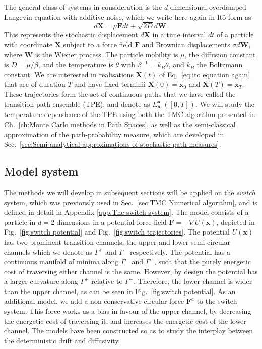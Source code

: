 The general class of systems in consideration is the $d$-dimensional overdamped Langevin equation with additive noise, which we write here again in Itô form as
\begin{equation} \label{eq:ito equation again}
d\mathbf{X}=\mu\mathbf{F}dt+\sqrt{2D}d\mathbf{W}. 
\end{equation}
This represents the stochastic displacement $d\mathbf{X}$ in a time
interval $dt$ of a particle with coordinate $\mathbf{X}$ subject
to a force field $\mathbf{F}$ and Brownian displacements $\sigma d\mathbf{W}$,
where $\mathbf{W}$ is the Wiener process. The particle mobility is
$\mu$, the diffusion constant is $D=\mu/\beta$, and the temperature
is $\theta$ with $\beta^{-1}=k_{B}\theta$, and $k_{B}$ the Boltzmann
constant. We are interested in realisations $\mathbf{X}(t)$ of Eq.~\ref{eq:ito equation again}
that are of duration $T$ and have fixed terminii $\mathbf{X}(0)=\mathbf{x}_{0}$
and $\mathbf{X}(T)=\mathbf{x}_{T}$. These trajectories form the set
of continuous paths that we have called the transition path ensemble (TPE), and denote as $E_{\mathbf{x}_0}^{\mathbf{x}}([0,T])$. We will study the temperature dependence of the TPE using both the TMC algorithm presented in Ch.~\ref{ch:Monte Carlo methods in Path Spaces}, as well as the semi-classical approximation of the path-probability measure, which are developed in Sec.~\ref{sec:Semi-analytical approximations of stochastic path measures}.

\subsection{Model system}

The methods we will develop in subsequent sections will be applied on the \textit{switch} system, which was previously used in Sec.~\ref{sec:TMC Numerical algorithm}, and is defined in detail in Appendix \ref{app:The switch system}.
The model consists of a particle in $d=2$ dimensions in a potential force field $\mathbf{F}=-\nabla U(\mathbf{x})$, depicted in Fig.~\ref{fig:switch potential} and Fig.~\ref{fig:switch trajectories}.
The potential $U(\mathbf{x})$ has two prominent transition channels, the upper and lower semi-circular channels which we denote as $\Gamma^{+}$ and $\Gamma^{-}$ respectively. The potential has a continuous manifold of minima along $\Gamma^{+}$ and $\Gamma^{-}$, such that the purely energetic cost of traversing either channel is the same. However, by design the potential has a larger curvature along $\Gamma^{+}$ relative to $\Gamma^{-}$. Therefore, the lower channel is wider than the upper channel, as can be seen in Fig.~\ref{fig:switch potential}. As an additional model, we add a non-conservative circular force $\mathbf{F}^{a}$ to the switch system. This force works as a bias in favour of the upper channel, by decreasing the energetic cost of traversing it, and increases the energetic cost of the lower channel. The models have been constructed so as to study the interplay between the deterministic drift and diffusivity.

